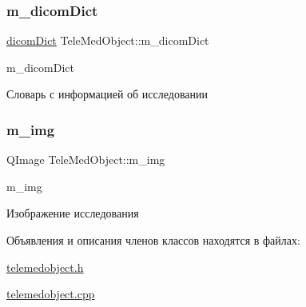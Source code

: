 \subsubsection{\texorpdfstring{m\+\_\+dicom\+Dict}{m\_dicomDict}}
{\footnotesize\ttfamily \hyperlink{tagshelpers_8h_ae25d30658f61420b88a380dc9e40bb74}{dicom\+Dict} Tele\+Med\+Object\+::m\+\_\+dicom\+Dict\hspace{0.3cm}{\ttfamily [private]}}



m\+\_\+dicom\+Dict 

Словарь с информацией об исследовании \mbox{\label{classTeleMedObject_a4ea4fc9f1c9e7f7e7760b1c7db163789}} 
\subsubsection{\texorpdfstring{m\+\_\+img}{m\_img}}
{\footnotesize\ttfamily Q\+Image Tele\+Med\+Object\+::m\+\_\+img\hspace{0.3cm}{\ttfamily [private]}}



m\+\_\+img 

Изображение исследования 

Объявления и описания членов классов находятся в файлах\+:\begin{DoxyCompactItemize}
\item 
\hyperlink{telemedobject_8h}{telemedobject.\+h}\item 
\hyperlink{telemedobject_8cpp}{telemedobject.\+cpp}\end{DoxyCompactItemize}
